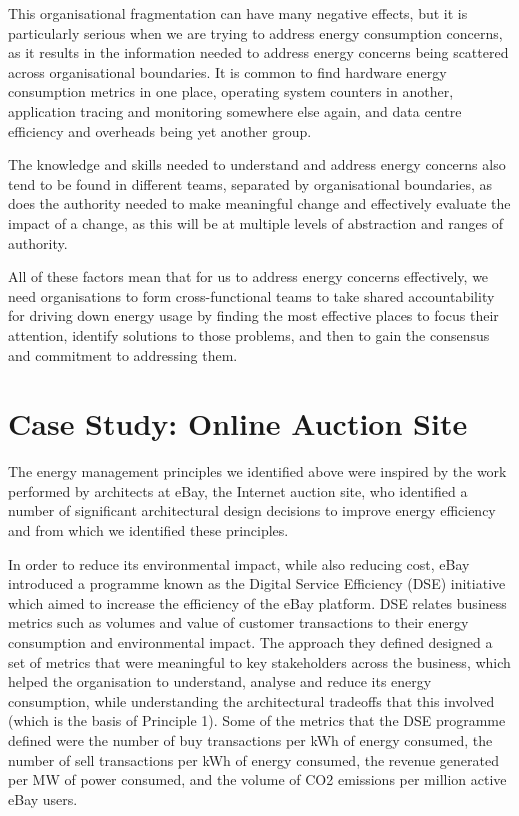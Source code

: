 This organisational fragmentation can have many negative effects, but it is particularly serious when we are trying to address energy consumption concerns, as it results in the information needed to address energy concerns being scattered across organisational boundaries.  It is common to find hardware energy consumption metrics in one place, operating system counters in another, application tracing and monitoring somewhere else again, and data centre efficiency and overheads being yet another group.

The knowledge and skills needed to understand and address energy concerns also tend to be found in different teams, separated by organisational boundaries, as does the authority needed to make meaningful change and effectively evaluate the impact of a change, as this will be at multiple levels of abstraction and ranges of authority.

All of these factors mean that for us to address energy concerns effectively, we need organisations to form cross-functional teams to take shared accountability for driving down energy usage by finding the most effective places to focus their attention, identify solutions to those problems, and then to gain the consensus and commitment to addressing them.

\section{Case Study: Online Auction Site}

The energy management principles we identified above were inspired by the work performed by architects at eBay, the Internet auction site, who identified a number of significant architectural design decisions to improve energy efficiency and from which we identified these principles.

In order to reduce its environmental impact, while also reducing cost, eBay introduced a programme known as the Digital Service Efficiency (DSE) initiative \cite{ebay2013-digitalefficiency} which aimed to increase the efficiency of the eBay platform. DSE relates business metrics such as volumes and value of customer transactions to their energy consumption and environmental impact.   The approach they defined designed a set of metrics that were meaningful to key stakeholders across the business, which helped the organisation to understand, analyse and reduce its energy consumption, while understanding the architectural tradeoffs that this involved (which is the basis of Principle 1). Some of the metrics that the DSE programme defined were the number of buy transactions per kWh of energy consumed, the number of sell transactions per kWh of energy consumed, the revenue generated per MW of power consumed, and the volume of CO2 emissions per million active eBay users.

